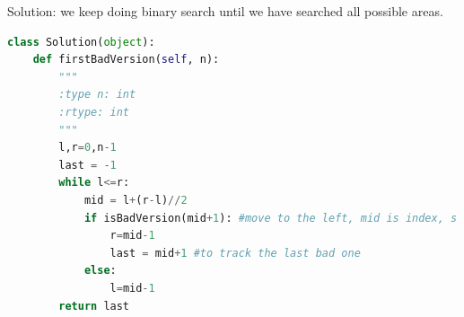 \documentclass[../searching.tex]{subfiles}
\begin{document}
\begin{examples}[resume]
Solution: we keep doing binary search until we have searched all possible areas.
\begin{lstlisting}[language = Python]
class Solution(object):
    def firstBadVersion(self, n):
        """
        :type n: int
        :rtype: int
        """
        l,r=0,n-1
        last = -1
        while l<=r:
            mid = l+(r-l)//2
            if isBadVersion(mid+1): #move to the left, mid is index, s
                r=mid-1
                last = mid+1 #to track the last bad one
            else:
                l=mid-1
        return last
\end{lstlisting}
\end{examples}


\end{document}
